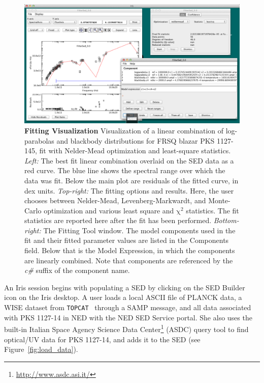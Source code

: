 \documentclass[final,5p,authoryear]{elsarticle}
\begin{document}
\begin{figure} \centering
\includegraphics[height=0.3\textheight]{figures/fitting-1.png}
\caption{\textbf{Fitting Visualization} Visualization of a linear combination of
log-parabolas and blackbody distributions for FRSQ blazar PKS 1127-145, fit with
Nelder-Mead optimization and least-square statistics. \textit{Left:} The best fit
linear combination overlaid on the SED data as a red curve. The blue line shows
the spectral range over which the data was fit. Below the main plot are
residuals of the fitted curve, in dex units. \textit{Top-right:} The fitting
options and results. Here, the user chooses between Nelder-Mead,
Levenberg-Markwardt, and Monte-Carlo \citep[Differential Evolution, ][]{Storn:1997:DEN:596061.596146}
optimization and various least square and
$\mathrm{\chi}^{2}$ statistics. The fit statistics are reported here after the
fit has been performed. \textit{Bottom-right:} The Fitting Tool window. The
model components used in the fit and their fitted parameter values are listed in
the Components field. Below that is the Model Expression, in which the
components are linearly combined. Note that components are referenced by the
\textit{c\#} suffix of the component name.} \label{fig:fitting1} \end{figure}

An Iris session begins with populating a SED by clicking on the SED Builder icon on the
Iris desktop. A user loads a local ASCII file of
PLANCK data, a WISE dataset from \verb|TOPCAT|~\citep[; ascl:1101.010]{2005ASPC..347...29T} 
through a SAMP message, and all data associated with PKS 1127-14 in NED with the NED SED
Service portal. She also uses the built-in Italian Space Agency Science Data
Center\footnote{\url{http://www.asdc.asi.it/}} (ASDC) query tool to find
optical/UV data for PKS 1127-14, and adds it to the SED (see
Figure~\ref{fig:load_data}).
\end{document}
